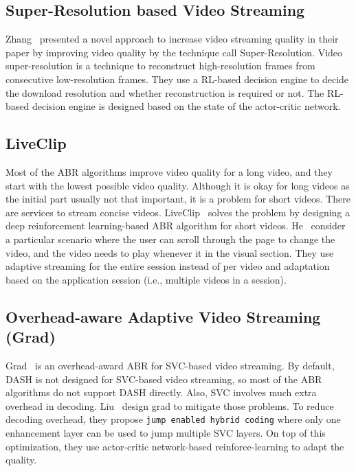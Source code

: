 \subsection{Super-Resolution based Video Streaming}
Zhang \etal\ presented a novel approach to increase video streaming quality in their paper \cite{9155384} by improving video quality by the technique call Super-Resolution. Video super-resolution is a technique to reconstruct high-resolution frames from consecutive low-resolution frames. They use a \ac{RL}-based decision engine to decide the download resolution and whether reconstruction is required or not. The \ac{RL}-based decision engine is designed based on the state of the actor-critic network.

\subsection{LiveClip}
Most of the \ac{ABR} algorithms improve video quality for a long video, and they start with the lowest possible video quality. Although it is okay for long videos as the initial part usually not that important, it is a problem for short videos. There are services to stream concise videos. LiveClip~\cite{10.1145/3386290.3396937} solves the problem by designing a deep reinforcement learning-based \ac{ABR} algorithm for short videos. He \etal\ consider a particular scenario where the user can scroll through the page to change the video, and the video needs to play whenever it in the visual section. They use adaptive streaming for the entire session instead of per video and adaptation based on the application session (i.e., multiple videos in a session).

\subsection{Overhead-aware Adaptive Video Streaming (Grad)}
Grad~\cite{10.1145/3394171.3413512} is an overhead-award \ac{ABR} for \ac{SVC}-based video streaming. By default, \ac{DASH} is not designed for \ac{SVC}-based video streaming, so most of the \ac{ABR} algorithms do not support DASH directly. Also, \ac{SVC} involves much extra overhead in decoding. Liu \etal\ design grad to mitigate those problems. To reduce decoding overhead, they propose {\tt jump enabled hybrid coding} where only one enhancement layer can be used to jump multiple \ac{SVC} layers. On top of this optimization, they use actor-critic network-based reinforce-learning to adapt the quality.

